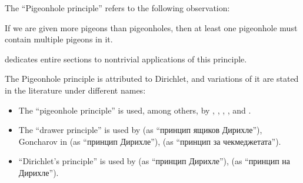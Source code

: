 \begin{concept}\label{con:pigeonhole_principle}
  The \enquote{Pigeonhole principle} refers to the following observation:
  \begin{displayquote}
    If we are given more pigeons than pigeonholes, then at least one pigeonhole must contain multiple pigeons in it.
  \end{displayquote}

   dedicates entire sections to nontrivial applications of this principle.

  The Pigeonhole principle is attributed to Dirichlet, and variations of it are stated in the literature under different names:
  \begin{itemize}
    \item The \enquote{pigeonhole principle} is used, among others, by , , , ,  and .
    \item The \enquote{drawer principle} is used by  (as \enquote{принцип ящиков Дирихле}), Goncharov in \cite[156]{АлександровМаркушевичХинчин1952ЭнциклопедияТом3} (as \enquote{принцип Дирихле}),  (as \enquote{принцип за чекмеджетата}).
    \item \enquote{Dirichlet's principle} is used by  (as \enquote{принцип Дирихле}),  (as \enquote{принцип на Дирихле}).
  \end{itemize}
\end{concept}

